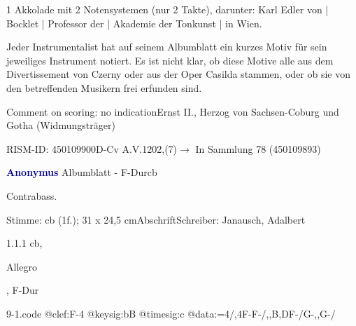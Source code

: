 \documentclass[a4paper, twocolumn, 11pt]{book}
\begin{document}
\newline %
\par 1 Akkolade mit 2 Notensystemen (nur 2 Takte), darunter: Karl Edler von | Bocklet | Professor der | Akademie der Tonkunst | in Wien.
\par Jeder Instrumentalist hat auf seinem Albumblatt ein kurzes Motiv für sein jeweiliges Instrument notiert. Es ist nicht klar, ob diese Motive alle aus dem {\textquotedbl}Divertissement{\textquotedbl} von Czerny oder aus der Oper {\textquotedbl}Casilda{\textquotedbl} stammen, oder ob sie von den betreffenden Musikern frei erfunden sind.
\par Comment on scoring: no indication\newline Ernst II., Herzog von Sachsen-Coburg und Gotha  (Widmungsträger)
\par RISM-ID: 450109900\newline D-Cv  A.V.1202,(7)\newline $\rightarrow$ In Sammlung 78 (450109893)
      
\par \vspace{16pt} \textcolor{darkblue}{\textbf{Anonymus  }}\hfillplus{[9]}\newline Albumblatt - F-Dur\newline cb
\par \begin{itshape}[heading:] Contrabass.\end{itshape} 
\par \textcolor{darkblue}{}  Stimme: cb  (1f.); 31 x 24,5 cm\newline Abschrift\newline Schreiber: Janausch, Adalbert
\par 1.1.1  cb, \begin{itshape}Allegro\end{itshape}, F-Dur  
\begin{filecontents*}{9-1.code}
@clef:F-4
@keysig:bB
@timesig:c
@data:=4/,4F-F-/,,B,DF-/G-,,G-/
\end{filecontents*}
\end{document}
